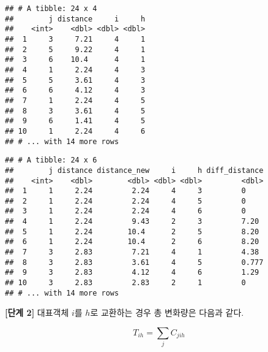 \documentclass[]{book}
\newenvironment{Shaded}{\begin{snugshade}}{\end{snugshade}}
\newcommand{\CommentTok}[1]{\textcolor[rgb]{0.56,0.35,0.01}{\textit{#1}}}
\newcommand{\DataTypeTok}[1]{\textcolor[rgb]{0.13,0.29,0.53}{#1}}
\newcommand{\KeywordTok}[1]{\textcolor[rgb]{0.13,0.29,0.53}{\textbf{#1}}}
\newcommand{\NormalTok}[1]{#1}
\newcommand{\OperatorTok}[1]{\textcolor[rgb]{0.81,0.36,0.00}{\textbf{#1}}}
\newcommand{\StringTok}[1]{\textcolor[rgb]{0.31,0.60,0.02}{#1}}
\begin{document}
\begin{verbatim}
## # A tibble: 24 x 4
##        j distance     i     h
##    <int>    <dbl> <dbl> <dbl>
##  1     3     7.21     4     1
##  2     5     9.22     4     1
##  3     6    10.4      4     1
##  4     1     2.24     4     3
##  5     5     3.61     4     3
##  6     6     4.12     4     3
##  7     1     2.24     4     5
##  8     3     3.61     4     5
##  9     6     1.41     4     5
## 10     1     2.24     4     6
## # ... with 14 more rows
\end{verbatim}

\begin{Shaded}
\end{Shaded}

\begin{verbatim}
## # A tibble: 24 x 6
##        j distance distance_new     i     h diff_distance
##    <int>    <dbl>        <dbl> <dbl> <dbl>         <dbl>
##  1     1     2.24         2.24     4     3         0    
##  2     1     2.24         2.24     4     5         0    
##  3     1     2.24         2.24     4     6         0    
##  4     1     2.24         9.43     2     3         7.20 
##  5     1     2.24        10.4      2     5         8.20 
##  6     1     2.24        10.4      2     6         8.20 
##  7     3     2.83         7.21     4     1         4.38 
##  8     3     2.83         3.61     4     5         0.777
##  9     3     2.83         4.12     4     6         1.29 
## 10     3     2.83         2.83     2     1         0    
## # ... with 14 more rows
\end{verbatim}

\textbf{{[}단계 2{]}} 대표객체 \(i\)를 \(h\)로 교환하는 경우 총 변화량은 다음과 같다.

\begin{equation*}
T_{ih} = \sum_{j} C_{jih}
\end{equation*}
\end{document}
